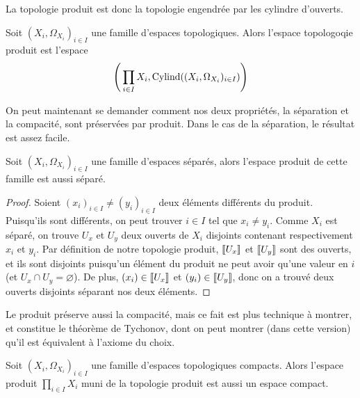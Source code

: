 La topologie produit est donc la topologie engendrée par les cylindre d'ouverts.

\begin{definition}
  Soit $(X_i,\Omega_{X_i})_{i\in I}$ une famille d'espaces topologiques. Alors
  l'espace topologoqie produit est l'espace
  \[\Bigg(\prod_{i\in I} X_i, \operatorname{Cylind}((X_i,\Omega_{X_i})_{i\in I})\Bigg)\]
\end{definition}

On peut maintenant se demander comment nos deux propriétés, la séparation et la
compacité, sont préservées par produit. Dans le cas de la séparation, le
résultat est assez facile.

\begin{proposition}
  Soit $(X_i,\Omega_{X_i})_{i\in I}$ une famille d'espaces séparés, alors l'espace
  produit de cette famille est aussi séparé.
\end{proposition}

\begin{proof}
  Soient $(x_i)_{i\in I}\neq (y_i)_{i\in I}$ deux éléments différents du produit.
  Puisqu'ils sont différents, on peut trouver $i\in I$ tel que $x_i \neq y_i$.
  Comme $X_i$ est séparé, on trouve $U_x$ et $U_y$ deux ouverts de $X_i$
  disjoints contenant respectivement $x_i$ et $y_i$. Par définition de notre
  topologie produit, $\llbracket U_x\rrbracket$ et $\llbracket U_y\rrbracket$ sont des ouverts, et ils
  sont disjoints puisqu'un élément du produit ne peut avoir qu'une valeur en $i$
  (et $U_x\cap U_y = \varnothing$). De plus, $(x_i)\in \llbracket U_x\rrbracket$ et
  $(y_i)\in\llbracket U_y\rrbracket$, donc on a trouvé deux ouverts disjoints séparant nos
  deux éléments.
\end{proof}

Le produit préserve aussi la compacité, mais ce fait est plus technique à
montrer, et constitue le théorème de Tychonov, dont on peut montrer (dans cette
version) qu'il est équivalent à l'axiome du choix.

\begin{theorem}[Tychonov]
  Soit $(X_i,\Omega_{X_i})_{i\in I}$ une famille d'espaces topologiques compacts.
  Alors l'espace produit $\displaystyle\prod_{i\in I} X_i$ muni de la topologie
  produit est aussi un espace compact.
\end{theorem}

